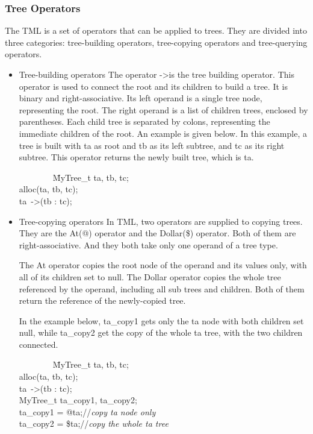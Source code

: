 \documentclass[12pt,psfig,a4]{article}
\begin{document}
\subsubsection{Tree Operators}
The TML is a set of operators that can be applied to trees. They are divided into three categories: tree-building operators, tree-copying operators and tree-querying operators.

\begin{itemize}
\item Tree-building operators
The operator -\textgreater is the tree building operator. This operator is used to connect the root and its children to build a tree. It is binary and right-associative. Its left operand is a single tree node, representing the root. The right operand is a list of children trees, enclosed by parentheses. Each child tree is separated by colons, representing the immediate children of the root. An example is given below. In this example, a tree is built with ta as root and tb as its left subtree, and tc as its right subtree. This operator returns the newly built tree, which is ta.
\begin{code}
\begin{tabbing}
~~~~~~~~\= MyTree\_t ta, tb, tc;\\
\> alloc(ta, tb, tc);\\
\> ta~-\textgreater(tb : tc);
\end{tabbing}
\end{code}

\item Tree-copying operators
In TML, two operators are supplied to copying trees. They are the At(@) operator and the Dollar(\$) operator. Both of them are right-associative. And they both take only one operand of a tree type. 

The At operator copies the root node of the operand and its values only, with all of its children set to null. The Dollar operator copies the whole tree referenced by the operand, including all sub trees and children. Both of them return the reference of the newly-copied tree.

In the example below, ta\_copy1 gets only the ta node with both children set null, while ta\_copy2 get the copy of the whole ta tree, with the two children connected.
\begin{code}
\begin{tabbing}
~~~~~~~~\= MyTree\_t ta, tb, tc;~~~~~~~\=\\
\> alloc(ta, tb, tc);\\
\> ta~-\textgreater(tb : tc);\\
\> MyTree\_t ta\_copy1, ta\_copy2;\\
\> ta\_copy1 = @ta;\>//\textit{copy ta node only}\\
\> ta\_copy2 = \$ta;\>//\textit{copy the whole ta tree }
\end{tabbing}
\end{code}



\end{itemize}
\end{document}
